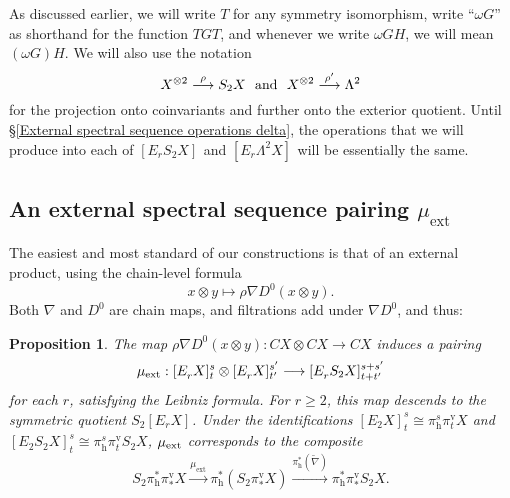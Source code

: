 \documentclass[11pt]{amsart} \renewcommand{\baselinestretch}{1.2}
\theoremstyle{plain}
\newtheorem{prop}[thm]{Proposition}
\numberwithin{equation}{section} %
\theoremstyle{plain}
\newtheorem{prop}[thm]{Proposition}
\numberwithin{equation}{chapter} %
\renewcommand{\to}{\longrightarrow}
\newcommand{\scrC}{\mathscr{C}}
\newcommand{\ExtCohProd}{\mu_\mathrm{ext}}
\newcommand{\twist}{\omega}
\newcommand{\Nabla}{\nabla}
\newcommand{\algs}{{\scrC\!\textit{\normalfont\textit{om}}}}
\newcommand{\E}[5]{[E^{#1}_{#2}#3]^{#4}_{#5}}
\newcommand{\Edownup}[5]{[E_{#1}^{#2}#3]^{#4}_{#5}}
\newcommand{\uver}{^\mathrm{v}}
\newcommand{\dhor}{_\mathrm{h}}
\renewcommand{\mapsto}{\longmapsto}
\newcommand{\SubsectionOrSection}[1]{\subsection{#1}}
\begin{document}
\begin{second quadrant homotopy sseq operations}
As discussed earlier, we will write $T$ for any symmetry isomorphism, write ``$\twist G$'' as shorthand for the function $TGT$, and  whenever we write $\twist GH$, we will mean $(\twist G)H$. We will also use the notation
\[X^{\otimes2}\overset{\rho}{\to}S_2X\textup{\ \ and\ \ }X^{\otimes2}\overset{\rho'}{\to}\Lambda^2
\]
for the projection onto coinvariants and further onto the exterior quotient. Until \S\ref{External spectral sequence operations delta}, the operations that we will produce into each of $\Edownup{r}{}{S_2X}{}{}$ and $\Edownup{r}{}{\Lambda^2X}{}{}$ will be essentially the same.
\SubsectionOrSection{An external spectral sequence pairing $\mu_\mathrm{ext}$}
The easiest and most standard of our constructions is that of an external product, using 
the chain-level formula
\[x\otimes y\mapsto\rho\Nabla D^0(x\otimes y).\]
Both $\Nabla$ and $D^0$ are chain maps, and filtrations add under $\Nabla D^0$, and thus:
\begin{prop}
\label{prop on basic product}
The map $\rho\Nabla D^0(x\otimes y):CX\otimes CX\to CX$ induces a pairing
\[\mu_\textup{ext}:\Edownup{r}{}{X}{s}{t}\otimes \Edownup{r}{}{X}{s'}{t'}\to \Edownup{r}{}{S_2X}{s+s'}{t+t'}\]
for each $r$, satisfying the Leibniz formula. For $r\geq2$, this map descends to the symmetric quotient $S_2\Edownup{r}{}{X}{}{}$. Under the identifications $\Edownup{2}{}{X}{s}{t}\cong \pi\dhor^s\pi\uver_t X$ and $\Edownup{2}{}{S_2X}{s}{t}\cong \pi\dhor^s\pi\uver_t S_2X$, $\mu_\textup{ext}$ corresponds to the composite
\[S_2\pi\dhor^*\pi\uver_* X
\overset{\ExtCohProd}{\to} 
\pi\dhor^*(S_2\pi\uver_* X)
\overset{\pi\dhor^{*}(\widetilde{\nabla})}{\to}
\pi\dhor^{*}\pi\uver_{*}S_2 X.\]
\end{prop}
%

\end{second quadrant homotopy sseq operations}
\end{document}
